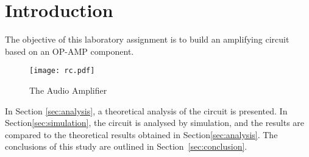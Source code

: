 \section{Introduction}
\label{sec:introduction}

The objective of this laboratory assignment is to build an amplifying circuit based on an OP-AMP component.


\begin{figure}[h] \centering
\texttt{[image: rc.pdf]}
\vspace{-5mm}
\caption{The Audio Amplifier}\label{fig:rc}
\end{figure}


In Section \ref{sec:analysis}, a theoretical analysis of the circuit is presented. In Section\ref{sec:simulation}, the circuit is analysed by simulation, and the results are compared to the theoretical results obtained in Section\ref{sec:analysis}. The conclusions of this study are outlined in Section~\ref{sec:conclusion}.






